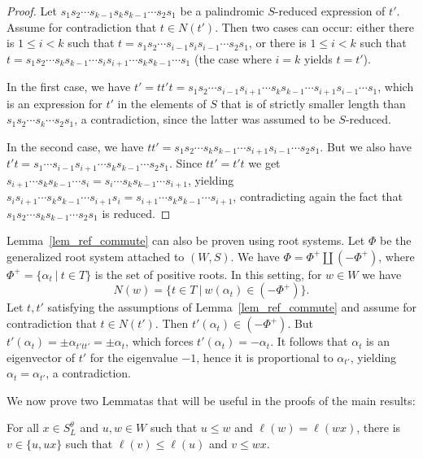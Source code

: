 \begin{proof}
	Let $s_1 s_2 \cdots s_{k-1} s_k s_{k-1}\cdots s_2 s_1$ be a palindromic $S$-reduced expression of $t'$. Assume for contradiction that $t\in N(t')$. Then two cases can occur: either there is $1\leq i < k$ such that $t=s_1 s_2 \cdots s_{i-1} s_i s_{i-1}\cdots s_2 s_1$, or there is $1 \leq i < k$ such that $t= s_1 s_2 \cdots s_k s_{k-1} \cdots s_i s_{i+1} \cdots s_k s_{k-1} \cdots s_1$ (the case where $i=k$ yields $t=t'$).
	
	In the first case, we have $t'=tt't= s_1 s_2 \cdots s_{i-1} s_{i+1} \cdots s_k s_{k-1} \cdots s_{i+1} s_{i-1} \cdots s_1$, which is an expression for $t'$ in the elements of $S$ that is of strictly smaller length than $s_1 s_2\cdots s_k \cdots s_2 s_1$, a contradiction, since the latter was assumed to be $S$-reduced. 
	
	In the second case, we have $tt'= s_1 s_2 \cdots s_k s_{k-1} \cdots s_{i+1} s_{i-1} \cdots s_2 s_1$. But we also have $t't= s_1 \cdots s_{i-1} s_{i+1}\cdots s_k s_{k-1} \cdots s_2 s_1$. Since $tt'=t't$ we get $s_{i+1} \cdots s_k s_{k-1} \cdots s_i = s_i \cdots s_k s_{k-1}\cdots s_{i+1}$, yielding $s_{i} s_{i+1} \cdots s_k s_{k-1} \cdots s_{i+1} s_i=s_{i+1} \cdots s_k s_{k-1} \cdots s_{i+1}$, contradicting again the fact that $s_1 s_2 \cdots s_k s_{k-1} \cdots s_2 s_1$ is reduced.  
\end{proof}
\begin{rema}
	Lemma~\ref{lem_ref_commute} can also be proven using root systems. Let $\Phi$ be the generalized root system attached to $(W,S)$. We have $\Phi=\Phi^+ \coprod (- \Phi^+)$, where $\Phi^+=\{\alpha_t~|~t\in T\}$ is the set of positive roots. In this setting, for $w\in W$ we have $$N(w)=\{t\in T~|~w(\alpha_t)\in(-\Phi^+)\}.$$ Let $t,t'$ satisfying the assumptions of Lemma~\ref{lem_ref_commute} and assume for contradiction that $t\in N(t')$. Then $t'(\alpha_t)\in(-\Phi^+)$. But $t'(\alpha_t)=\pm \alpha_{t'tt'}=\pm \alpha_{t}$, which forces $t'(\alpha_t)=-\alpha_t$. It follows that $\alpha_t$ is an eigenvector of $t'$ for the eigenvalue $-1$, hence it is proportional to $\alpha_{t'}$, yielding $\alpha_t=\alpha_{t'}$, a contradiction. 
\end{rema}

We now prove two Lemmatas that will be useful in the proofs of the main results: 

\begin{lemma}\label{lem_corr}
For all $x\in S_L^\theta$ and $u, w\in W$ such that $u \leq w$ and $\ell(w)=\ell(wx)$, there is $v\in \{u, ux\}$ such that $\ell(v)\leq \ell(u)$ and $v \leq wx$. 
\end{lemma}

